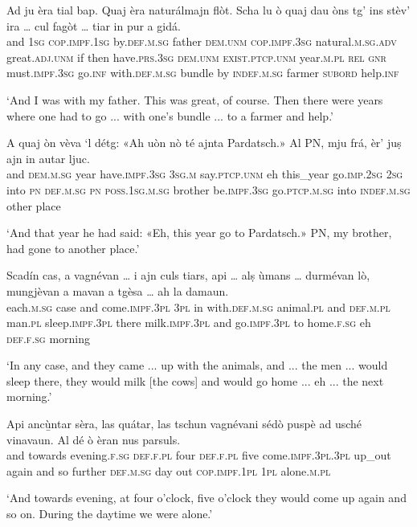 \begin{linenumbers}
	\gll Ad ju èra tial bap. Quaj èra naturálmajn flòt. Scha lu ò quaj dau òns tg’ ins stèv’ ira … cul fagòt … tiar in pur a gidá.   \\
	and \textsc{1sg} \textsc{cop.impf.1sg} by.\textsc{def.m.sg} father \textsc{dem.unm} \textsc{cop.impf.3sg} natural.\textsc{m.sg.adv} great.\textsc{adj.unm} if then have.\textsc{prs.3sg} \textsc{dem.unm} \textsc{exist.ptcp.unm} year.\textsc{m.pl} \textsc{rel} \textsc{gnr} must.\textsc{impf.3sg} go.\textsc{inf} {} with.\textsc{def.m.sg} bundle {} by \textsc{indef.m.sg} farmer \textsc{subord} help.\textsc{inf} \\
\end{linenumbers}
\medskip
\glt `And I was with my father. This was great, of course. Then there were years where one had to go ... with one's bundle ... to a farmer and help.'
\medskip

\begin{linenumbers}
	\gll  A quaj òn vèva `l détg: «Ah uòn nò té ajnta Pardatsch.» Al PN, mju frá, èr’ juṣ ajn in autar ljuc.\\
and \textsc{dem.m.sg} year have.\textsc{impf.3sg} \textsc{3sg.m} say.\textsc{ptcp.unm} eh this\_year go.\textsc{imp.2sg} \textsc{2sg} into \textsc{pn} \textsc{def.m.sg} \textsc{pn} \textsc{poss.1sg.m.sg} brother be.\textsc{impf.3sg} go.\textsc{ptcp.m.sg} into \textsc{indef.m.sg} other place	\\
\end{linenumbers}
\medskip
\glt `And that year he had said: «Eh, this year go to Pardatsch.» PN, my brother, had gone to another place.'
\medskip

\begin{linenumbers}
	\gll Scadín cas, a vagnévan … i ajn culs tiars, api … alṣ ùmans … durmévan lò, mungjèvan a mavan a tgèsa … ah la damaun.\\
each.\textsc{m.sg} case and come.\textsc{impf.3pl} {} \textsc{3pl} in with.\textsc{def.m.sg} animal.\textsc{pl} and {} \textsc{def.m.pl} man.\textsc{pl} {} sleep.\textsc{impf.3pl} there milk.\textsc{impf.3pl} and go.\textsc{impf.3pl} to home.\textsc{f.sg} {} eh \textsc{def.f.sg} morning	\\
\end{linenumbers}
\medskip
\glt `In any case, and they came ... up with the animals, and ... the men ... would sleep there, they would milk [the cows] and would go home ... eh ... the next morning.'
\medskip

\begin{linenumbers}
	\gll Api ancù̱ntar sèra, las quátar, las tschun vagnévani sédò puspè ad usché vinavaun. Al dé ò èran nus parsuls.\\
	and towards evening.\textsc{f.sg} \textsc{def.f.pl} four \textsc{def.f.pl} five come.\textsc{impf.3pl.3pl} up\_out again and so further \textsc{def.m.sg} day out \textsc{cop.impf.1pl} \textsc{1pl} alone.\textsc{m.pl}\\
\end{linenumbers}
\medskip
\glt `And towards evening, at four o'clock, five o'clock they would come up again and so on. During the daytime we were alone.'
\medskip

